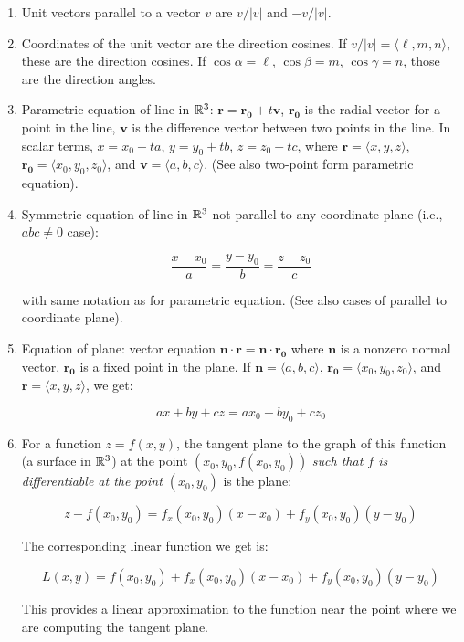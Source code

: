 \documentclass[10pt]{amsart}
\begin{document}
\begin{enumerate}

\item Unit vectors parallel to a vector $v$ are $v/|v|$ and $-v/|v|$.
\item Coordinates of the unit vector are the direction cosines. If
  $v/|v| = \langle \ell,m,n\rangle$, these are the direction
  cosines. If $\cos \alpha = \ell$, $\cos \beta = m$, $\cos \gamma =
  n$, those are the direction angles.
\item Parametric equation of line in $\mathbb{R}^3$: $\mathbf{r} =
  \mathbf{r_0} + t\mathbf{v}$, $\mathbf{r_0}$ is the radial vector for
  a point in the line, $\mathbf{v}$ is the difference vector between
  two points in the line. In scalar terms, $x = x_0 + ta$, $y = y_0 +
  tb$, $z = z_0 + tc$, where $\mathbf{r} = \langle x,y,z \rangle$,
  $\mathbf{r_0} = \langle x_0,y_0,z_0 \rangle$, and $\mathbf{v} =
  \langle a,b,c \rangle$. (See also two-point form parametric equation).
\item Symmetric equation of line in $\mathbb{R}^3$ not parallel to any
  coordinate plane (i.e., $abc \ne 0$ case):

  $$\frac{x - x_0}{a} = \frac{y - y_0}{b} = \frac{z - z_0}{c}$$

  with same notation as for parametric equation. (See also cases of
  parallel to coordinate plane).
\item Equation of plane: vector equation $\mathbf{n} \cdot \mathbf{r}
  = \mathbf{n} \cdot \mathbf{r_0}$ where $\mathbf{n}$ is a nonzero
  normal vector, $\mathbf{r_0}$ is a fixed point in the plane. If
  $\mathbf{n} = \langle a,b,c \rangle$, $\mathbf{r_0} = \langle x_0,
  y_0, z_0 \rangle$, and $\mathbf{r} = \langle x,y,z \rangle$, we get:

  $$ax + by + cz = ax_0 + by_0 + cz_0$$
\item For a function $z = f(x,y)$, the tangent plane to the graph of
  this function (a surface in $\mathbb{R}^3$) at the point
  $(x_0,y_0,f(x_0,y_0))$ {\em such that $f$ is differentiable at the
    point $(x_0,y_0)$} is the plane:

  $$z - f(x_0,y_0) = f_x(x_0,y_0)(x - x_0) + f_y(x_0,y_0)(y - y_0)$$

  The corresponding linear function we get is:

  $$L(x,y) = f(x_0,y_0) + f_x(x_0,y_0)(x - x_0) + f_y(x_0,y_0)(y - y_0)$$

  This provides a linear approximation to the function near the point
  where we are computing the tangent plane.
\end{enumerate}
\end{document}
